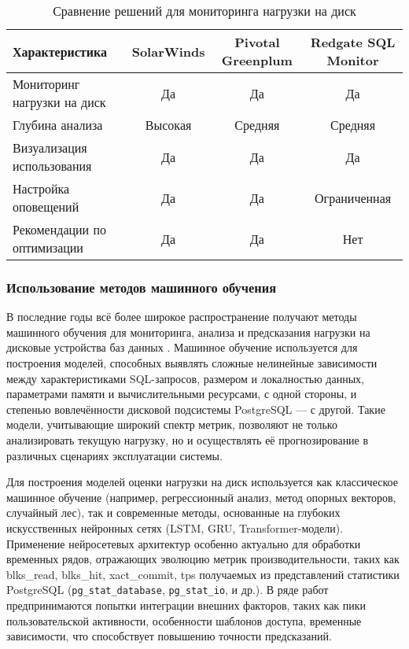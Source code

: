 \begin{table}[H]
    \centering
    \small %
    \setlength{\tabcolsep}{4pt} %
    \renewcommand{\arraystretch}{1.2} %
    \begin{tabular}{|p{5cm}|c|c|c|}
        \hline
        \textbf{Характеристика} & \textbf{SolarWinds} & \textbf{Pivotal Greenplum} & \textbf{Redgate SQL Monitor} \\ 
        \hline
        Мониторинг нагрузки на диск & Да & Да & Да \\ 
        \hline
        Глубина анализа & Высокая & Средняя & Средняя \\ 
        \hline
        Визуализация использования & Да & Да & Да \\ 
        \hline
        Настройка оповещений & Да & Да & Ограниченная \\ 
        \hline
        Рекомендации по оптимизации & Да & Да & Нет \\ 
        \hline
    \end{tabular}
    \caption{Сравнение решений для мониторинга нагрузки на диск}
    \label{tab:disk_monitoring}
\end{table}
\subsubsection{Использование методов машинного обучения}

В последние годы всё более широкое распространение получают методы машинного обучения для мониторинга, 
анализа и предсказания нагрузки на дисковые устройства баз данных \cite{zaghloul2024correction, chen2019machine, sun2023predictive}. 
Машинное обучение используется для построения моделей, способных выявлять сложные нелинейные зависимости между характеристиками 
SQL-запросов, размером и локалностью данных, параметрами памяти и вычислительными ресурсами, с одной стороны, 
и степенью вовлечённости дисковой подсистемы PostgreSQL — с другой. \cite{cheng2025rlstorage} Такие модели, учитывающие широкий спектр метрик, 
позволяют не только анализировать текущую нагрузку, но и осуществлять её прогнозирование в различных сценариях эксплуатации системы.

Для построения моделей оценки нагрузки на диск используется как классическое машинное обучение (например, регрессионный анализ, метод опорных векторов, случайный лес),
так и современные методы, основанные на глубоких искусственных нейронных сетях (LSTM, GRU, Transformer-модели). 
Применение нейросетевых архитектур особенно актуально для обработки временных рядов, отражающих эволюцию метрик производительности, 
таких как blks\_read, blks\_hit, xact\_commit, tps получаемых из представлений статистики PostgreSQL (\texttt{pg\_stat\_database}, 
\texttt{pg\_stat\_io}, и др.). В ряде работ предпринимаются попытки интеграции внешних факторов, таких как пики пользовательской активности, 
особенности шаблонов доступа, временные зависимости, что способствует повышению точности предсказаний\cite{sun2023predictive}.

